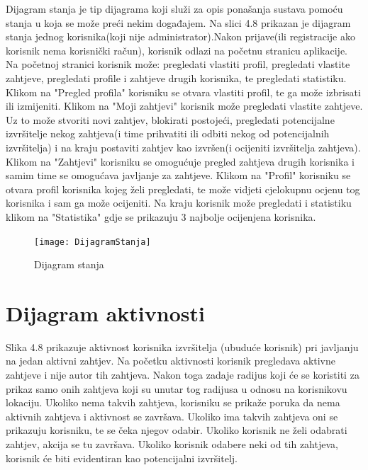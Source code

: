 			Dijagram stanja je tip dijagrama koji služi za opis ponašanja sustava pomoću stanja u koja se može preći nekim događajem. Na slici 4.8 prikazan je dijagram stanja jednog korisnika(koji nije administrator).Nakon prijave(ili registracije ako korisnik nema korisnički račun), korisnik odlazi na početnu stranicu aplikacije. Na početnoj stranici korisnik može: pregledati vlastiti profil, pregledati vlastite zahtjeve, pregledati profile i zahtjeve drugih korisnika, te pregledati statistiku. Klikom na "Pregled profila" korisniku se otvara vlastiti profil, te ga može izbrisati ili izmijeniti. Klikom na "Moji zahtjevi" korisnik može pregledati vlastite zahtjeve. Uz to može stvoriti novi zahtjev, blokirati postojeći, pregledati potencijalne izvršitelje nekog zahtjeva(i time prihvatiti ili odbiti nekog od potencijalnih izvršitelja) i na kraju postaviti zahtjev kao izvršen(i ocijeniti izvršitelja zahtjeva).
			Klikom na "Zahtjevi" korisniku se omogućuje pregled zahtjeva drugih korisnika i samim time se omogućava javljanje za zahtjeve. Klikom na "Profil" korisniku se otvara profil korisnika kojeg želi pregledati, te može vidjeti cjelokupnu ocjenu tog korisnika i sam ga može ocijeniti. Na kraju korisnik može pregledati i statistiku klikom na "Statistika" gdje se prikazuju 3 najbolje ocijenjena korisnika. 
			
			\begin{figure}[h]
				\texttt{[image: DijagramStanja]}
				\caption{Dijagram stanja}
			\end{figure}
			
			
			\eject 
		
		\section{Dijagram aktivnosti}
			
			Slika 4.8 prikazuje aktivnost korisnika izvršitelja (ubuduće korisnik) pri javljanju na jedan aktivni zahtjev. Na početku aktivnosti korisnik pregledava aktivne zahtjeve i nije autor tih zahtjeva. Nakon toga zadaje radijus koji će se koristiti za prikaz samo onih zahtjeva koji su unutar tog radijusa u odnosu na korisnikovu lokaciju. Ukoliko nema takvih zahtjeva, korisniku se prikaže poruka da nema aktivnih zahtjeva i aktivnost se završava. Ukoliko ima takvih zahtjeva oni se prikazuju korisniku, te se čeka njegov odabir. Ukoliko korisnik ne želi odabrati zahtjev, akcija se tu završava. Ukoliko korisnik odabere neki od tih zahtjeva, korisnik će biti evidentiran kao potencijalni izvršitelj.
		
